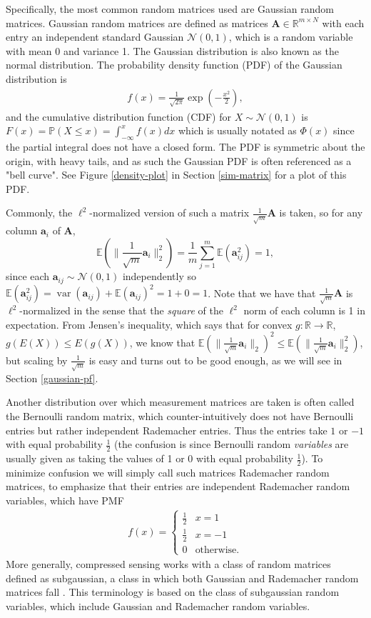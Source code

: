 \documentclass[12pt,a4paper]{amsart}
\numberwithin{equation}{section}
\theoremstyle{plain}
\theoremstyle{definition}
\newcommand{\BR}{\mathbb R}
\newcommand{\BE}{\mathbb E}
\newcommand{\BP}{\mathbb P}
\newcommand{\bda}{\mathbf{a}}
\newcommand{\bdA}{\mathbf{A}}
\DeclareMathOperator{\var}{var}
\begin{document}
Specifically, the most common random matrices used are Gaussian random matrices. Gaussian random matrices are defined as matrices $\bdA\in\BR^{m\times N}$ with each entry an independent standard Gaussian $\mathcal{N}(0,1)$, which is a random variable with mean 0 and variance 1. The Gaussian distribution is also known as the normal distribution. The probability density function (PDF) of the Gaussian distribution is 
\begin{align*}
    f(x)=\frac{1}{\sqrt{2\pi}}\exp(-\frac{x^2}{2}),
\end{align*}
and the cumulative distribution function (CDF) for $X\sim\mathcal{N}(0,1)$ is $F(x)=\BP(X\leq x)=\int_{-\infty}^xf(x)dx$ which is usually notated as $\Phi(x)$ since the partial integral does not have a closed form. The PDF is symmetric about the origin, with heavy tails, and as such the Gaussian PDF is often referenced as a "bell curve". See Figure \ref{density-plot} in Section \ref{sim-matrix} for a plot of this PDF.

Commonly, the $\ell^2$-normalized version of such a matrix $\frac{1}{\sqrt{m}}\bdA$ is taken, so for any column $\bda_i$ of $\bdA$, $$\BE(\|\frac{1}{\sqrt{m}}\bda_i\|^2_2)=\frac{1}{m}\sum_{j=1}^m\BE(\bda_{ij}^2)=1,$$ since each $\bda_{ij}\sim\mathcal{N}(0,1)$ independently so $\BE(\bda_{ij}^2)=\var(\bda_{ij})+\BE(\bda_{ij})^2=1+0=1$. Note that we have that $\frac{1}{\sqrt{m}}\bdA$ is $\ell^2$-normalized in the sense that the \textit{square} of the $\ell^2$ norm of each column is 1 in expectation. From Jensen's inequality, which says that for convex $g:\BR\rightarrow\BR$, $g(E(X))\leq E(g(X))$, we know that $\BE(\|\frac{1}{\sqrt{m}}\bda_i\|_2)^2\leq\BE(\|\frac{1}{\sqrt{m}}\bda_i\|^2_2)$, but scaling by $\frac{1}{\sqrt{m}}$ is easy and turns out to be good enough, as we will see in Section \ref{gaussian-pf}.

Another distribution over which measurement matrices are taken is often called the Bernoulli random matrix, which counter-intuitively does not have Bernoulli entries but rather independent Rademacher entries. Thus the entries take $1$ or $-1$ with equal probability $\frac{1}{2}$ (the confusion is since Bernoulli random \textit{variables} are usually given as taking the values of 1 or 0 with equal probability $\frac{1}{2}$). To minimize confusion we will simply call such matrices Rademacher random matrices, to emphasize that their entries are independent Rademacher random variables, which have PMF
\begin{align*}
    f(x)=\begin{cases}
        \frac{1}{2} & x = 1 \\
        \frac{1}{2} & x = -1 \\
        0 & \text{otherwise}.
    \end{cases}
\end{align*}
More generally, compressed sensing works with a class of random matrices defined as subgaussian, a class in which both Gaussian and Rademacher random matrices fall \cite{fou-rau}. This terminology is based on the class of subgaussian random variables, which include Gaussian and Rademacher random variables.
\end{document}
